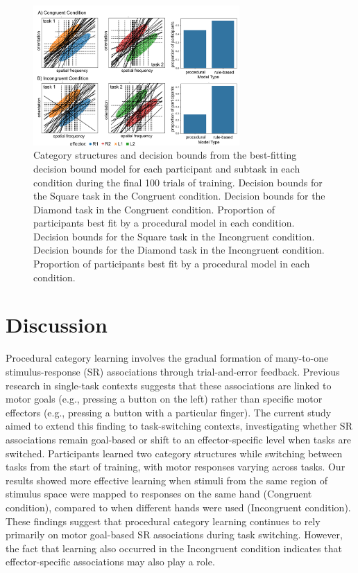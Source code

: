 \documentclass[doc, floatsintext]{apa7}
\begin{document}
\begin{figure}[h!]
    \centering
    \includegraphics[width=0.7\textwidth]{../figures/fig_dbm.png}
    \caption{
        Category structures and decision bounds from the
        best-fitting decision bound model for each participant
        and subtask in each condition during the final 100
        trials of training. 
         Decision bounds for the Square task in the Congruent condition.
         Decision bounds for the Diamond task in the Congruent condition.
         Proportion of participants best fit by a procedural model in each condition.
         Decision bounds for the Square task in the Incongruent condition.
         Decision bounds for the Diamond task in the Incongruent condition.
         Proportion of participants best fit by a procedural model in each condition.
    }
    \label{fig_dbm}
\end{figure}

\section{Discussion}
Procedural category learning involves the gradual formation
of many-to-one stimulus-response (SR) associations through
trial-and-error feedback. Previous research in single-task
contexts suggests that these associations are linked to
motor goals (e.g., pressing a button on the left) rather
than specific motor effectors (e.g., pressing a button with
a particular finger). The current study aimed to extend this
finding to task-switching contexts, investigating whether SR
associations remain goal-based or shift to an
effector-specific level when tasks are switched.
Participants learned two category structures while switching
between tasks from the start of training, with motor
responses varying across tasks. Our results showed more
effective learning when stimuli from the same region of
stimulus space were mapped to responses on the same hand
(Congruent condition), compared to when different hands were
used (Incongruent condition). These findings suggest that
procedural category learning continues to rely primarily on
motor goal-based SR associations during task switching.
However, the fact that learning also occurred in the
Incongruent condition indicates that effector-specific
associations may also play a role.
\end{document}
